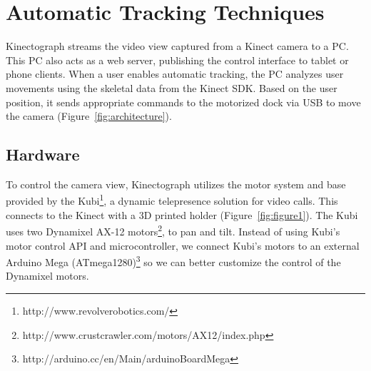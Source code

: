 \section{Automatic Tracking Techniques}
Kinectograph streams the video view captured from a Kinect camera to a PC. This PC also acts as a web server, publishing the control interface to tablet or phone clients. When a user enables automatic tracking, the PC analyzes user movements using the skeletal data from the Kinect SDK. Based on the user position, it sends appropriate commands to the motorized dock via USB to move the camera (Figure~\ref{fig:architecture}).

\subsection{Hardware}
To control the camera view, Kinectograph utilizes the motor system and base provided by the Kubi\footnote{http://www.revolverobotics.com/}, a dynamic telepresence solution for video calls. This connects to the Kinect with a 3D printed holder (Figure~\ref{fig:figure1}). The Kubi uses two Dynamixel AX-12 motors\footnote{http://www.crustcrawler.com/motors/AX12/index.php}, to pan and tilt. Instead of using Kubi's motor control API and microcontroller, we connect Kubi's motors to an external Arduino Mega (ATmega1280)\footnote{http://arduino.cc/en/Main/arduinoBoardMega} so we can better customize the control of the Dynamixel motors.



